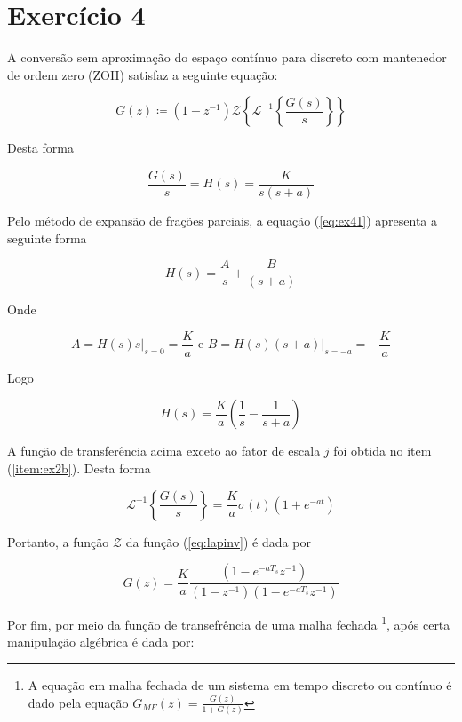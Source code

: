 \documentclass{article}
\begin{document}
\section*{Exercício 4}

A conversão sem aproximação do espaço contínuo para discreto com mantenedor de ordem zero (ZOH) satisfaz a seguinte equação:

\begin{equation}
G(z) \coloneqq (1-z^{-1}) \mathcal{Z}\left\{\mathcal{L}^{-1}\left\{\frac{G(s)}{s}\right\}\right\}
\end{equation}

Desta forma

\begin{equation}
\label{eq:ex41}
\frac{G(s)}{s} = H(s) = \frac{K}{s(s+a)}
\end{equation}

Pelo método de expansão de frações parciais, a equação (\ref{eq:ex41}) apresenta a seguinte forma

\begin{equation}
H(s) = \frac{A}{s} + \frac{B}{(s+a)} 
\end{equation}

Onde 

\begin{equation}
A = H(s) s \bigg\rvert_{s=0} = \frac{K}{a} \mbox{ e } B = H(s) (s+a)\bigg\rvert_{s=-a} = -\frac{K}{a}
\end{equation}

Logo

\begin{equation}
H(s) = \frac{K}{a} \left( \frac{1}{s} - \frac{1}{s+a} \right)
\end{equation}

A função de transferência acima exceto ao fator de escala $j$ foi obtida no item (\ref{item:ex2b}). Desta forma

\begin{equation}
\label{eq:lapinv}
\mathcal{L}^{-1}\left\{\frac{G(s)}{s}\right\} = \frac{K}{a}\sigma(t)\left(1+e^{-at}\right)
\end{equation}

Portanto, a função $\mathcal{Z}$ da função (\ref{eq:lapinv}) é dada por

\begin{equation}
G(z) = \frac{K}{a} \frac{(1 - e^{-aT_s}z^{-1})}{(1-z^{-1})(1 - e^{-aT_s}z^{-1})}
\end{equation}

Por fim, por meio da função de transefrência de uma malha fechada \footnote{A equação em malha fechada de um sistema em tempo discreto ou contínuo é dado pela equação $G_{MF}(z) = \frac{G(z)}{1+G(z)}$}, após certa manipulação algébrica é dada por:
\end{document}
